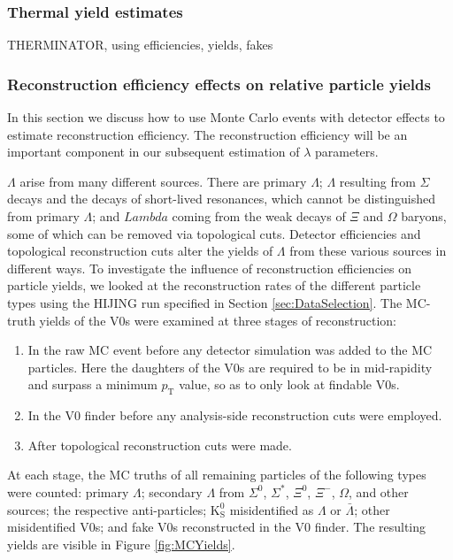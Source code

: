 




\subsubsection{Thermal yield estimates}
\label{sec:ThermalYields}

THERMINATOR, using efficiencies, yields, fakes






\subsubsection{Reconstruction efficiency effects on relative particle yields}
\label{sec:ReconstructionEff}

In this section we discuss how to use Monte Carlo events with detector effects to estimate reconstruction efficiency.  
The reconstruction efficiency will be an important component in our subsequent estimation of $\lambda$ parameters.

$\Lambda$ arise from many different sources.
There are primary $\Lambda$; $\Lambda$ resulting from $\Sigma$ decays and the decays of short-lived resonances, which cannot be distinguished from primary $\Lambda$; and $Lambda$ coming from the weak decays of $\Xi$ and $\Omega$ baryons, some of which can be removed via topological cuts.
Detector efficiencies and topological reconstruction cuts alter the yields of $\Lambda$ from these various sources in different ways.
To investigate the influence of reconstruction efficiencies on particle yields, we looked at the reconstruction rates of the different particle types using the HIJING run specified in Section \ref{sec:DataSelection}.  
The MC-truth yields of the V0s were examined at three stages of reconstruction:
\begin{enumerate}
\item In the raw MC event before any detector simulation was added to the MC particles.  
Here the daughters of the V0s are required to be in mid-rapidity and surpass a minimum $p_\mathrm{T}$ value, so as to only look at findable V0s.
\item In the V0 finder before any analysis-side reconstruction cuts were employed.
\item After topological reconstruction cuts were made.
\end{enumerate}
At each stage, the MC truths of all remaining particles of the following types were counted: primary $\Lambda$; secondary $\Lambda$ from $\Sigma^0$, $\Sigma^*$, $\Xi^0$, $\Xi^-$, $\Omega$, and other sources; the respective anti-particles; $\mathrm{K}^0_{\mathrm{S}}$ misidentified as $\Lambda$ or $\bar{\Lambda}$; other misidentified V0s; and fake V0s reconstructed in the V0 finder.  
The resulting yields are visible in Figure \ref{fig:MCYields}.

